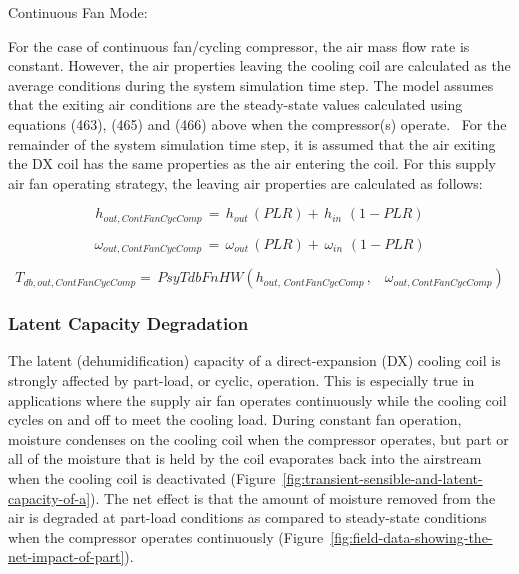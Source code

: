 Continuous Fan Mode:

For the case of continuous fan/cycling compressor, the air mass flow rate is constant. However, the air properties leaving the cooling coil are calculated as the average conditions during the system simulation time step. The model assumes that the exiting air conditions are the steady-state values calculated using equations (463), (465) and (466) above when the compressor(s) operate.~ For the remainder of the system simulation time step, it is assumed that the air exiting the DX coil has the same properties as the air entering the coil. For this supply air fan operating strategy, the leaving air properties are calculated as follows:

\begin{equation}
{h_{out,ContFanCycComp}}\, = \,{h_{out}}\,\left( {PLR} \right) + \,{h_{in}}\,\,\left( {1 - PLR} \right)
\end{equation}

\begin{equation}
{\omega_{out,ContFanCycComp}}\, = \,{\omega_{out}}\,\left( {PLR} \right) + \,{\omega_{in}}\,\,\left( {1 - PLR} \right)
\end{equation}

\begin{equation}
{T_{db,out,ContFanCycComp}} = \,PsyTdbFnHW({h_{out,\,ContFanCycComp}}\,,\,\,\,\,\,{\omega_{out,ContFanCycComp}})
\end{equation}

\subsubsection{Latent Capacity Degradation}\label{latent-capacity-degradation}

The latent (dehumidification) capacity of a direct-expansion (DX) cooling coil is strongly affected by part-load, or cyclic, operation. This is especially true in applications where the supply air fan operates continuously while the cooling coil cycles on and off to meet the cooling load. During constant fan operation, moisture condenses on the cooling coil when the compressor operates, but part or all of the moisture that is held by the coil evaporates back into the airstream when the cooling coil is deactivated (Figure~\ref{fig:transient-sensible-and-latent-capacity-of-a}). The net effect is that the amount of moisture removed from the air is degraded at part-load conditions as compared to steady-state conditions when the compressor operates continuously (Figure~\ref{fig:field-data-showing-the-net-impact-of-part}).

